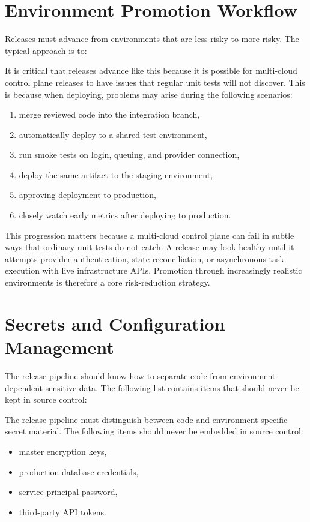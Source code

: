 \section{Environment Promotion Workflow}
Releases must advance from environments that are less risky to more risky. The typical approach is to:

It is critical that releases advance like this because it is possible for multi-cloud control plane releases to have issues that regular unit tests will not discover. This is because when deploying, problems may arise during the following scenarios:

\begin{enumerate}
    \item merge reviewed code into the integration branch,
    \item automatically deploy to a shared test environment,
    \item run smoke tests on login, queuing, and provider connection,
    \item deploy the same artifact to the staging environment,
    \item approving deployment to production,
    \item closely watch early metrics after deploying to production.
\end{enumerate}

This progression matters because a multi-cloud control plane can fail in subtle ways that ordinary unit tests do not catch. A release may look healthy until it attempts provider authentication, state reconciliation, or asynchronous task execution with live infrastructure APIs. Promotion through increasingly realistic environments is therefore a core risk-reduction strategy.

\section{Secrets and Configuration Management}
The release pipeline should know how to separate code from environment-dependent sensitive data. The following list contains items that should never be kept in source control:


The release pipeline must distinguish between code and environment-specific secret material. The following items should never be embedded in source control:
\begin{itemize}
    \item master encryption keys,
    \item production database credentials,
    \item service principal password,
    \item third-party API tokens.
\end{itemize}


